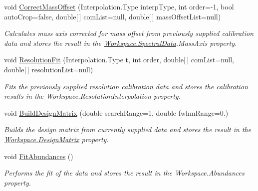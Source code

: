 \begin{DoxyCompactItemize}
void \hyperlink{class_isotope_fit_1_1_workspace_a188d75c84db3eb6b5c3812e44eb95695}{Correct\+Mass\+Offset} (Interpolation.\+Type interp\+Type, int order=-\/1, bool auto\+Crop=false, double\mbox{[}$\,$\mbox{]} com\+List=null, double\mbox{[}$\,$\mbox{]} mass\+Offset\+List=null)
\begin{DoxyCompactList}\small\item\em Calculates mass axis corrected for mass offset from previously supplied calibration data and stores the result in the \hyperlink{class_isotope_fit_1_1_workspace_a1d6cc2dd07cbfe920da9f1bffc9b32c2}{Workspace.\+Spectral\+Data}.Mass\+Axis property. \end{DoxyCompactList}\item 
void \hyperlink{class_isotope_fit_1_1_workspace_a00c1ae2e3b1d443808bef150a1e99410}{Resolution\+Fit} (Interpolation.\+Type t, int order, double\mbox{[}$\,$\mbox{]} com\+List=null, double\mbox{[}$\,$\mbox{]} resolution\+List=null)
\begin{DoxyCompactList}\small\item\em Fits the previously supplied resolution calibration data and stores the calibration results in the Workspace.\+Resolution\+Interpolation property. \end{DoxyCompactList}\item 
void \hyperlink{class_isotope_fit_1_1_workspace_a760f024c67d57242c40c558298bd1878}{Build\+Design\+Matrix} (double search\+Range=1, double fwhm\+Range=0.)
\begin{DoxyCompactList}\small\item\em Builds the design matrix from currently supplied data and stores the result in the \hyperlink{class_isotope_fit_1_1_workspace_ae24a2ee8f965fb2ed7ad3a592163271d}{Workspace.\+Design\+Matrix} property. \end{DoxyCompactList}\item 
void \hyperlink{class_isotope_fit_1_1_workspace_a40fa9b2c0b5d31feae1093d08b1aad52}{Fit\+Abundances} ()
\begin{DoxyCompactList}\small\item\em Performs the fit of the data and stores the result in the Workspace.\+Abundances property. \end{DoxyCompactList}\end{DoxyCompactItemize}
